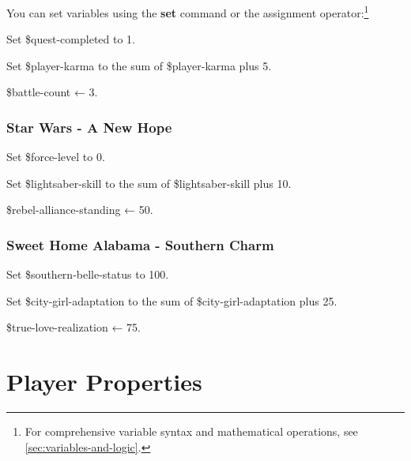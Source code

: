 \documentclass[11pt,letterpaper,oldstylefigures]{memoir}
\newcommand{\stagedir}[1]{#1\par\vspace{1\baselineskip}}
\newenvironment{FountainExample}
  {\begingroup
  \ttfamily\small
   \setlength{\parindent}{0pt}
  \setlength{\parskip}{0.5em}
  \allowdisplaybreaks
  \setlength{\displaywidowpenalty}{0}
  \setlength{\widowpenalty}{0}
  \setlength{\clubpenalty}{0}
  \setlength{\interlinepenalty}{0}
}
  {\endgroup}
\newcommand{\fountain}[1]{\textbf{#1}}
\begin{document}
You can set variables using the \fountain{set} command or the assignment operator:\footnote{For comprehensive variable syntax and mathematical operations, see \autoref{sec:variables-and-logic}.}

\begin{FountainExample}
\stagedir{Set \$quest-completed to 1.}
\end{FountainExample}
\begin{FountainExample}
\stagedir{Set \$player-karma to the sum of \$player-karma plus 5.}
\end{FountainExample}
\begin{FountainExample}
\stagedir{\$battle-count ← 3.}
\end{FountainExample}

\subsubsection*{Star Wars - A New Hope}
\label{ex:star-wars-a-new-hope}

\begin{FountainExample}
\stagedir{Set \$force-level to 0.}
\end{FountainExample}
\begin{FountainExample}
\stagedir{Set \$lightsaber-skill to the sum of \$lightsaber-skill plus 10.}
\end{FountainExample}
\begin{FountainExample}
\stagedir{\$rebel-alliance-standing ← 50.}
\end{FountainExample}
\subsubsection*{Sweet Home Alabama - Southern Charm}
\label{ex:sweet-home-alabama-southern-charm}

\begin{FountainExample}
\stagedir{Set \$southern-belle-status to 100.}
\end{FountainExample}
\begin{FountainExample}
\stagedir{Set \$city-girl-adaptation to the sum of \$city-girl-adaptation plus 25.}
\end{FountainExample}
\begin{FountainExample}
\stagedir{\$true-love-realization ← 75.}
\end{FountainExample}

\section{Player Properties}
\end{document}
